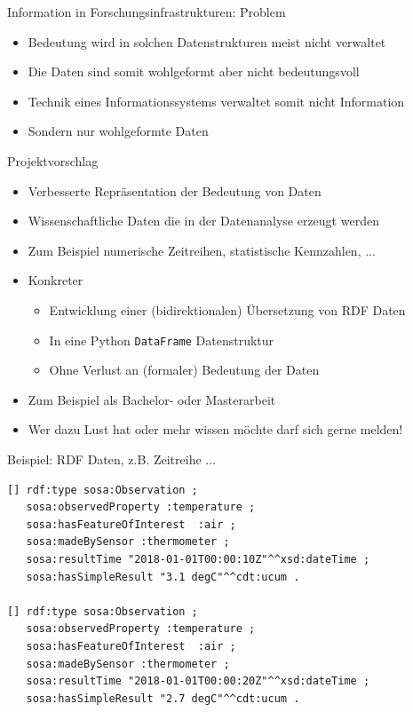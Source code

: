 \documentclass{beamer}
\begin{document}
\begin{frame}{Information in Forschungsinfrastrukturen: Problem}
	
	\begin{itemize}
		\item Bedeutung wird in solchen Datenstrukturen meist nicht verwaltet
		\item Die Daten sind somit wohlgeformt aber nicht bedeutungsvoll
		\item Technik eines Informationssystems verwaltet somit nicht Information
		\item Sondern nur wohlgeformte Daten
	\end{itemize}
	
\end{frame}

\begin{frame}{Projektvorschlag}
	
	\begin{itemize}
		\item Verbesserte Repräsentation der Bedeutung von Daten
		\item Wissenschaftliche Daten die in der Datenanalyse erzeugt werden
		\item Zum Beispiel numerische Zeitreihen, statistische Kennzahlen, ...
		\item Konkreter
		\begin{itemize}
			\item Entwicklung einer (bidirektionalen) Übersetzung von RDF Daten
			\item In eine Python \texttt{DataFrame} Datenstruktur
			\item Ohne Verlust an (formaler) Bedeutung der Daten
		\end{itemize}
		\item Zum Beispiel als Bachelor- oder Masterarbeit
		\item Wer dazu Lust hat oder mehr wissen möchte darf sich gerne melden!
	\end{itemize}
	
\end{frame}

\begin{frame}[fragile]{Beispiel: RDF Daten, z.B. Zeitreihe ...}
	
	\begin{lstlisting}
[] rdf:type sosa:Observation ;
   sosa:observedProperty :temperature ;
   sosa:hasFeatureOfInterest  :air ;
   sosa:madeBySensor :thermometer ;
   sosa:resultTime "2018-01-01T00:00:10Z"^^xsd:dateTime ;
   sosa:hasSimpleResult "3.1 degC"^^cdt:ucum .
   
[] rdf:type sosa:Observation ;
   sosa:observedProperty :temperature ;
   sosa:hasFeatureOfInterest  :air ;
   sosa:madeBySensor :thermometer ;
   sosa:resultTime "2018-01-01T00:00:20Z"^^xsd:dateTime ;
   sosa:hasSimpleResult "2.7 degC"^^cdt:ucum .
	\end{lstlisting}
	
\end{frame}
\end{document}
